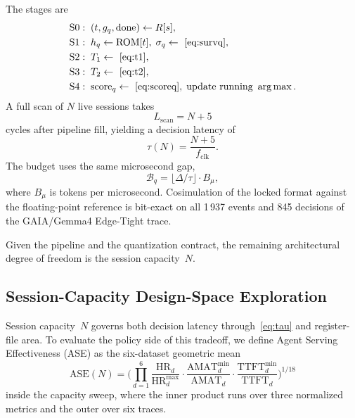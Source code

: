 The stages are
\begin{equation}
  \begin{aligned}
    \mathrm{S0}&:\;
      (t,g_{q},\mathrm{done})\leftarrow R[s],\\
    \mathrm{S1}&:\;
      h_{q}\leftarrow\mathrm{ROM}[t],\;
      \sigma_{q}\leftarrow~\eqref{eq:survq},\\
    \mathrm{S2}&:\;
      T_{1}\leftarrow~\eqref{eq:t1},\\
    \mathrm{S3}&:\;
      T_{2}\leftarrow~\eqref{eq:t2},\\
    \mathrm{S4}&:\;
      \mathrm{score}_{q}\leftarrow~\eqref{eq:scoreq},\;
      \text{update running }\arg\max.
  \end{aligned}
  \label{eq:pipe}
\end{equation}
A full scan of $N$ live sessions takes
\begin{equation}
  L_{\mathrm{scan}}=N+5
  \label{eq:scan}
\end{equation}
cycles after pipeline fill, yielding a decision latency of
\begin{equation}
  \tau(N)=\frac{N+5}{f_{\mathrm{clk}}}.
  \label{eq:tau}
\end{equation}
The \tide budget uses the same microsecond gap,
\begin{equation}
  \mathcal{B}_{q}
  =\bigl\lfloor\Delta/\tau\bigr\rfloor\cdot B_{\mu},
  \label{eq:budgetq}
\end{equation}
where $B_{\mu}$ is tokens per microsecond.
Cosimulation of the locked format against the floating-point reference
is bit-exact on all 1\,937 events and 845 decisions of the GAIA/Gemma4
Edge-Tight trace.

Given the pipeline and the quantization contract, the remaining
architectural degree of freedom is the session capacity~$N$.

\subsection{Session-Capacity Design-Space Exploration}
\label{sec:dse}

Session capacity~$N$ governs both decision latency
through~\eqref{eq:tau} and register-file area. To evaluate the policy
side of this tradeoff, we define Agent Serving Effectiveness (ASE) as
the six-dataset geometric mean
\begin{equation}
  \mathrm{ASE}(N)=
  \Biggl(\prod_{d=1}^{6}
    \frac{\mathrm{HR}_d}{\mathrm{HR}_d^{\max}}
    \cdot
    \frac{\mathrm{AMAT}_d^{\min}}{\mathrm{AMAT}_d}
    \cdot
    \frac{\mathrm{TTFT}_d^{\min}}{\mathrm{TTFT}_d}
  \Biggr)^{1/18}
  \label{eq:ase}
\end{equation}
inside the capacity sweep, where the inner product runs over three
normalized metrics and the outer over six traces.

